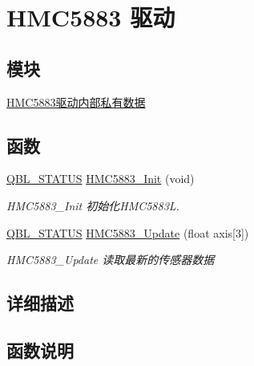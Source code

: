 \hypertarget{group__hmc5883__driver}{}\section{H\+M\+C5883 驱动}
\label{group__hmc5883__driver}
\subsection*{模块}
\begin{DoxyCompactItemize}
\item 
\hyperlink{group__hmc5883__driver__private}{H\+M\+C5883驱动内部私有数据}
\end{DoxyCompactItemize}
\subsection*{函数}
\begin{DoxyCompactItemize}
\item 
\hyperlink{group__qbl_ga41526b685f55486191108499fe91c30b}{Q\+B\+L\+\_\+\+S\+T\+A\+T\+US} \hyperlink{group__hmc5883__driver_ga23d45753863d03d2e20ad4175965cb75}{H\+M\+C5883\+\_\+\+Init} (void)
\begin{DoxyCompactList}\small\item\em H\+M\+C5883\+\_\+\+Init 初始化\+H\+M\+C5883L. \end{DoxyCompactList}\item 
\hyperlink{group__qbl_ga41526b685f55486191108499fe91c30b}{Q\+B\+L\+\_\+\+S\+T\+A\+T\+US} \hyperlink{group__hmc5883__driver_gab380fb39719ca6cd76c4277cd0a8e1c8}{H\+M\+C5883\+\_\+\+Update} (float axis\mbox{[}3\mbox{]})
\begin{DoxyCompactList}\small\item\em H\+M\+C5883\+\_\+\+Update 读取最新的传感器数据 \end{DoxyCompactList}\end{DoxyCompactItemize}


\subsection{详细描述}


\subsection{函数说明}
